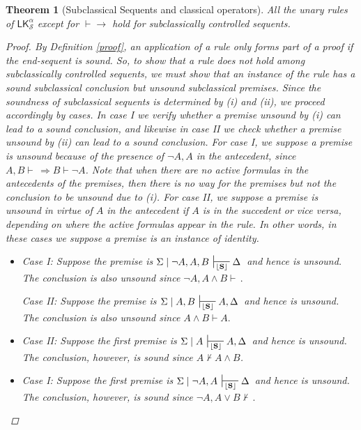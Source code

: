 \documentclass{article}                     %
\theoremstyle{theorem}
\newtheorem{theorem}{Theorem}
\theoremstyle{corollary}
\theoremstyle{lemma}
\theoremstyle{definition}
\theoremstyle{remark}
\theoremstyle{definition}
\theoremstyle{notation}
\theoremstyle{definition}
\theoremstyle{proposition}
\theoremstyle{definition}
\begin{document}
\begin{theorem}[Subclassical Sequents and classical operators]
All the unary rules of $ \mathsf{LK}^\alpha_\mathcal{S} $ except for $\vdash\to$ hold for subclassically controlled sequents.

\begin{proof}
By Definition \ref{proof}, an application of a rule only forms part of a proof if the end-sequent is sound. So, to show that a rule does not hold among subclassically controlled sequents, we must show that an instance of the rule has a sound subclassical conclusion but unsound subclassical premises. Since the soundness of subclassical sequents is determined by (i) and (ii), we proceed accordingly by cases. In case I we verify whether a premise unsound by (i) can lead to a sound conclusion, and likewise in case II we check whether a premise unsound by (ii) can lead to a sound conclusion. For case I, we suppose a premise is unsound because of the presence of $ \neg A , A$ in the antecedent, since $ A,B \vdash \,\Rightarrow B\vdash \neg A$. Note that when there are no active formulas in the antecedents of the premises, then there is no way for the premises but not the conclusion to be unsound due to (i). For case II, we suppose a premise is unsound in virtue of $ A $ in the antecedent if $ A $ is in the succedent or vice versa, depending on where the active formulas appear in the rule. In other words, in these cases we suppose a premise is an instance of identity.



\begin{itemize}[itemsep=3mm]
	\item[$\checkmark \wedge\vdash $]
Case I: Suppose the premise is $\Sigma\mid\neg A ,A, B \,\sststile{\lfloor\mathbf{S}\rfloor}{} \Delta\,$ and hence is unsound. The conclusion is also unsound since $ \neg A, A \wedge B \vdash \,. $

Case II: Suppose the premise is $\Sigma\mid A, B \,\sststile{\lfloor\mathbf{S}\rfloor}{} A, \Delta\,$ and hence is unsound. The conclusion is also unsound since $ A \wedge B \vdash A. $

  \item[$\vdash\wedge $]
Case II: Suppose the first premise is $\Sigma\mid A \,\sststile{\lfloor\mathbf{S}\rfloor}{} A, \Delta\,$ and hence is unsound. The conclusion, however, is sound since $ A \nvdash A \wedge B $.

	\item[$ \vee\vdash $]
Case I: Suppose the first premise is $\Sigma\mid\neg A ,A\,\sststile{\lfloor\mathbf{S}\rfloor}{} \Delta\,$ and hence is unsound. The conclusion, however, is sound since $ \neg A, A \vee B \nvdash \,. $


\end{itemize}
\end{proof}
\end{theorem}
\end{document}
